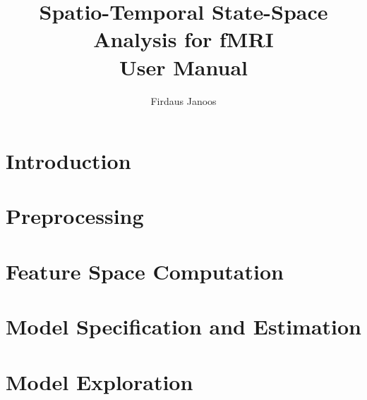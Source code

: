 \documentclass{book}
\begin{document}
\title{Spatio-Temporal State-Space Analysis for fMRI\\
\textbf{User Manual}}
\author{Firdaus Janoos} %


\maketitle



\tableofcontents
\listoffigures

\chapter{Introduction}


\chapter{Preprocessing}


\chapter{Feature Space Computation}
\label{chap:feature-space}


\chapter{Model Specification and Estimation}


\chapter{Model Exploration}
\label{chap:explore}





\end{document}
